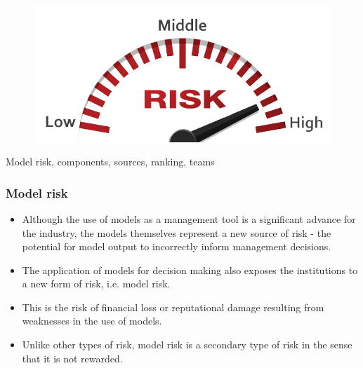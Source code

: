 \documentclass[11pt]{beamer}
\begin{document}
\begin{frame}
\begin{figure}[h]
	\centering
	\includegraphics[scale=.4]{images/risk}
\end{figure}
\centering
Model risk, components, sources, ranking, teams
\end{frame}


\begin{frame}
\frametitle{Model risk}
\begin{itemize}
	\item Although the use of models as a management tool is a significant advance for the industry, the models themselves represent a new source of risk - the potential for model output to incorrectly inform management decisions.
	\item The application of models for decision making also exposes the institutions to a new form of risk, i.e. model risk. 
	\item This is the risk of financial loss or reputational damage resulting from weaknesses in the use of models. 
	\item Unlike other types of risk, model risk is a secondary type of risk in the sense that it is not rewarded.
\end{itemize}
\end{frame}
\end{document}
